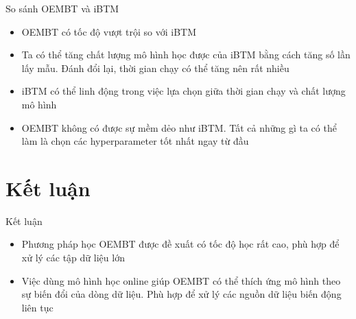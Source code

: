 \documentclass[pdf]{beamer}
\begin{document}
\begin{frame}{So sánh OEMBT và iBTM}
	\begin{itemize}
		\item OEMBT có tốc độ vượt trội so với iBTM
		\item Ta có thể tăng chất lượng mô hình học được của iBTM bằng cách tăng số lần lấy mẫu. Đánh đổi lại, thời gian chạy có thể tăng nên rất nhiều
		\item iBTM có thể linh động trong việc lựa chọn giữa thời gian chạy và chất lượng mô hình
		\item OEMBT không có được sự mềm dẻo như iBTM. Tất cả những gì ta có thể làm là chọn các hyperparameter tốt nhất ngay từ đầu
	\end{itemize}
\end{frame}

\section{Kết luận}
	\begin{frame}{Kết luận}
		\begin{itemize}
			\item Phương pháp học OEMBT được đề xuất có tốc độ học rất cao, phù hợp để xử lý các tập dữ liệu lớn
			\item Việc dùng mô hình học online giúp OEMBT có thể thích ứng mô hình theo sự biến đổi của dòng dữ liệu. Phù hợp để xử lý các nguồn dữ liệu biến động liên tục
		\end{itemize}
	\end{frame}
\end{document}
